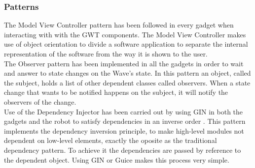 \subsubsection{Patterns}
The Model View Controller pattern has been followed in every gadget when interacting with with the GWT components. The Model View Controller makes use of object orientation to divide a software application to separate the internal representation of the software from the way it is shown to the user.\\[.2cm]
The Observer pattern has been implemented in all the gadgets in order to wait and answer to state changes on the Wave's state. In this pattern an object, called the subject, holds a list of other dependent classes called observers. When a state change that wants to be notified happens on the subject, it will notify the observers of the change.\\[.2cm]
Use of the Dependency Injector has been carried out by using GIN in both the gadgets and the robot to satisfy dependencies in an inverse order \cite{ref:dependency_injection}. This pattern implements the dependency inversion principle, to make high-level modules not dependent on low-level elements, exactly the oposite as the traditional dependency pattern. To achieve it the dependencies are passed by reference to the dependent object. Using GIN or Guice makes this process very simple.

